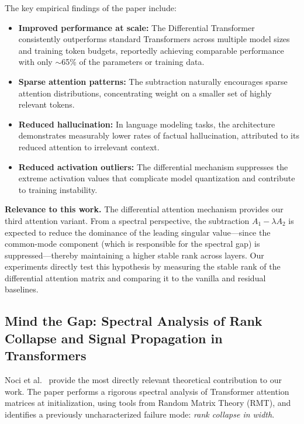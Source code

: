\documentclass[12pt, a4paper]{article}
\begin{document}
The key empirical findings of the paper include:
\begin{itemize}[leftmargin=1.5em]
    \item \textbf{Improved performance at scale:} The Differential
          Transformer consistently outperforms standard Transformers
          across multiple model sizes and training token budgets,
          reportedly achieving comparable performance with only
          $\sim$65\% of the parameters or training data.
    \item \textbf{Sparse attention patterns:} The subtraction naturally
          encourages sparse attention distributions, concentrating
          weight on a smaller set of highly relevant tokens.
    \item \textbf{Reduced hallucination:} In language modeling tasks,
          the architecture demonstrates measurably lower rates of
          factual hallucination, attributed to its reduced attention to
          irrelevant context.
    \item \textbf{Reduced activation outliers:} The differential
          mechanism suppresses the extreme activation values that
          complicate model quantization and contribute to training
          instability.
\end{itemize}

\textbf{Relevance to this work.} The differential attention mechanism
provides our third attention variant. From a spectral perspective, the
subtraction $A_1 - \lambda A_2$ is expected to reduce the dominance of
the leading singular value---since the common-mode component (which is
responsible for the spectral gap) is suppressed---thereby maintaining a
higher stable rank across layers. Our experiments directly test this
hypothesis by measuring the stable rank of the differential attention
matrix and comparing it to the vanilla and residual baselines.

\subsection{Mind the Gap: Spectral Analysis of Rank Collapse and Signal
Propagation in Transformers}

Noci et al.~\cite{mind_the_gap} provide the most directly relevant
theoretical contribution to our work. The paper performs a rigorous
spectral analysis of Transformer attention matrices at initialization,
using tools from Random Matrix Theory (RMT), and identifies a previously
uncharacterized failure mode: \textit{rank collapse in width}.
\end{document}
